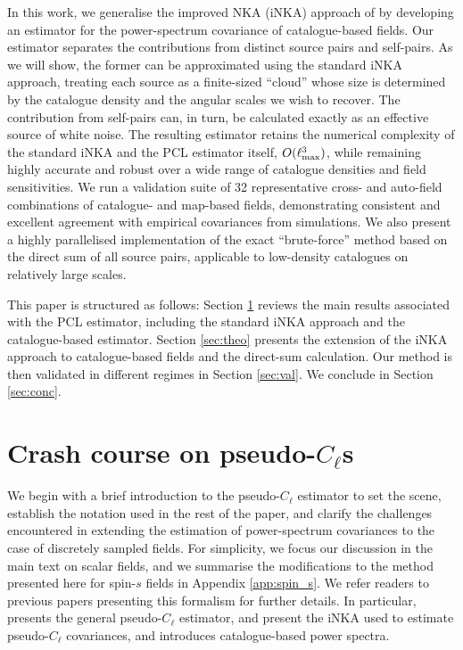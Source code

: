 \documentclass[%
 reprint,
superscriptaddress,
nofootinbib,
 amsmath,amssymb,
 aps,
 prd,
]{revtex4-2}
\begin{document}
    In this work, we generalise the improved NKA (iNKA) approach of \cite{2010.09717} by developing an estimator for the power-spectrum covariance of catalogue-based fields. Our estimator separates the contributions from distinct source pairs and self-pairs. As we will show, the former can be approximated using the standard iNKA approach, treating each source as a finite-sized ``cloud'' whose size is determined by the catalogue density and the angular scales we wish to recover. The contribution from self-pairs can, in turn, be calculated exactly as an effective source of white noise. The resulting estimator retains the numerical complexity of the standard iNKA and the PCL estimator itself, $O(\ell_{\rm max}^3)$, while remaining highly accurate and robust over a wide range of catalogue densities and field sensitivities. We run a validation suite of 32 representative cross- and auto-field combinations of catalogue- and map-based fields, demonstrating consistent and excellent agreement with empirical covariances from simulations. We also present a highly parallelised implementation of the exact ``brute-force'' method based on the direct sum of all source pairs, applicable to low-density catalogues on relatively large scales.

    This paper is structured as follows: Section \ref{sec:pcls} reviews the main results associated with the PCL estimator, including the standard iNKA approach and the catalogue-based estimator. Section \ref{sec:theo} presents the extension of the iNKA approach to catalogue-based fields and the direct-sum calculation. Our method is then validated in different regimes in Section \ref{sec:val}. We conclude in Section \ref{sec:conc}. 

\section{Crash course on pseudo-\texorpdfstring{$C_\ell$}{CL}s}\label{sec:pcls}
  We begin with a brief introduction to the pseudo-$C_\ell$ estimator to set the scene, establish the notation used in the rest of the paper, and clarify the challenges encountered in extending the estimation of power-spectrum covariances to the case of discretely sampled fields. For simplicity, we focus our discussion in the main text on scalar fields, and we summarise the modifications to the method presented here for spin-$s$ fields in Appendix \ref{app:spin_s}. We refer readers to previous papers presenting this formalism for further details. In particular, \cite{1809.09603} presents the general pseudo-$C_\ell$ estimator, \cite{1906.11765} and \cite{2010.09717} present the iNKA used to estimate pseudo-$C_\ell$ covariances, and \cite{2407.21013} introduces catalogue-based power spectra.
\end{document}
